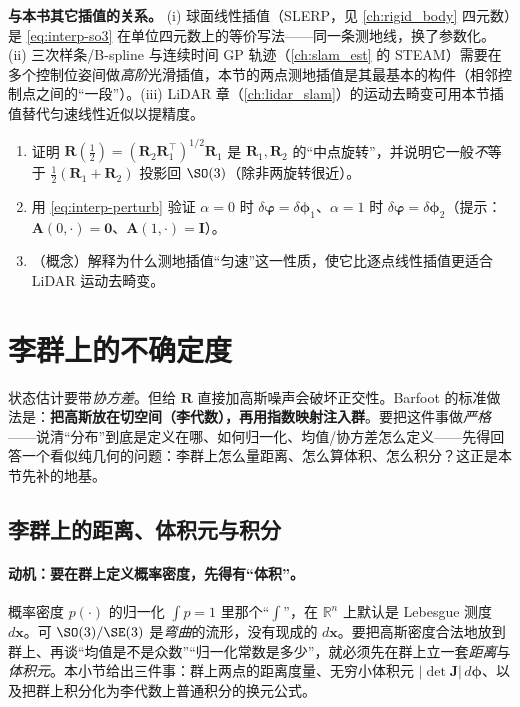 \begin{note}
\textbf{与本书其它插值的关系。}\;
(i) 球面线性插值（SLERP，见 \cref{ch:rigid_body} 四元数）是 \cref{eq:interp-so3} 在单位四元数上的等价写法——同一条测地线，换了参数化。(ii) 三次样条/B-spline 与连续时间 GP 轨迹（\cref{ch:slam_est} 的 STEAM）需要在多个控制位姿间做\emph{高阶}光滑插值，本节的两点测地插值是其最基本的构件（相邻控制点之间的“一段”）。(iii) LiDAR 章（\cref{ch:lidar_slam}）的运动去畸变可用本节插值替代匀速线性近似以提精度。
\end{note}

\begin{practice}
\begin{enumerate}
  \item 证明 $\mathbf{R}(\tfrac12)=(\mathbf{R}_2\mathbf{R}_1^\top)^{1/2}\mathbf{R}_1$ 是 $\mathbf{R}_1,\mathbf{R}_2$ 的“中点旋转”，并说明它一般\emph{不}等于 $\tfrac12(\mathbf{R}_1+\mathbf{R}_2)$ 投影回 $\SO(3)$（除非两旋转很近）。
  \item 用 \cref{eq:interp-perturb} 验证 $\alpha=0$ 时 $\delta\boldsymbol{\varphi}=\delta\boldsymbol{\phi}_1$、$\alpha=1$ 时 $\delta\boldsymbol{\varphi}=\delta\boldsymbol{\phi}_2$（提示：$\mathbf{A}(0,\cdot)=\mathbf{0}$、$\mathbf{A}(1,\cdot)=\mathbf{I}$）。
  \item （概念）解释为什么测地插值“匀速”这一性质，使它比逐点线性插值更适合 LiDAR 运动去畸变。
\end{enumerate}
\end{practice}

\section{李群上的不确定度}
\label{sec:uncertainty}

状态估计要带\emph{协方差}。但给 $\mathbf{R}$ 直接加高斯噪声会破坏正交性。Barfoot\cite{barfoot2024state} 的标准做法是：\textbf{把高斯放在切空间（李代数），再用指数映射注入群}。要把这件事做\emph{严格}——说清“分布”到底是定义在哪、如何归一化、均值/协方差怎么定义——先得回答一个看似纯几何的问题：李群上怎么量距离、怎么算体积、怎么积分？这正是本节先补的地基。

\subsection{李群上的距离、体积元与积分}
\label{subsec:lie-measure}

\paragraph{动机：要在群上定义概率密度，先得有“体积”。}
概率密度 $p(\cdot)$ 的归一化 $\int p=1$ 里那个“$\int$”，在 $\mathbb{R}^n$ 上默认是 Lebesgue 测度 $d\mathbf{x}$。可 $\SO(3)/\SE(3)$ 是\emph{弯曲}的流形，没有现成的 $d\mathbf{x}$。要把高斯密度合法地放到群上、再谈“均值是不是众数”“归一化常数是多少”，就必须先在群上立一套\emph{距离}与\emph{体积元}。本小节给出三件事：群上两点的距离度量、无穷小体积元 $|\det\mathbf{J}|\,d\boldsymbol{\phi}$、以及把群上积分化为李代数上普通积分的换元公式。

